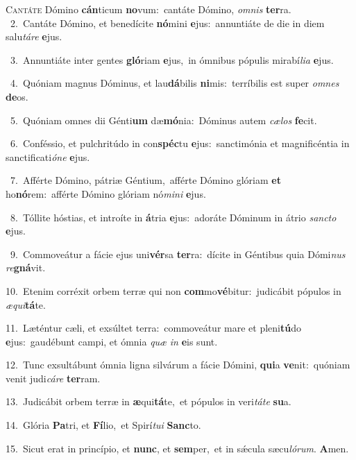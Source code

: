 \lettrine{\initial\textcolor{\initialcolor}{C}}{antáte} Dómino \textbf{cán}\-ticum \textbf{no}\-vum:~\star cantáte Dómino, \textit{om}\-\textit{nis} \textbf{ter}\-ra.\\
{\numbfont\textcolor{\numbcolor}{~2.}}~Cantáte Dómino, et benedícite \textbf{nó}\-mini \textbf{e}\-jus:~\star annuntiáte de die in diem salu\-\textit{tá}\-\textit{re} \textbf{e}\-jus.\par
{\numbfont\textcolor{\numbcolor}{~3.}}~Annuntiáte inter gentes \textbf{gló}\-riam \textbf{e}\-jus,~\star in ómnibus pópulis mirabí\-\textit{li}\-\textit{a} \textbf{e}\-jus.\par
{\numbfont\textcolor{\numbcolor}{~4.}}~Quóniam magnus Dóminus, et lau\-\textbf{dá}\-bilis \textbf{ni}\-mis:~\star terríbilis est super \textit{om}\-\textit{nes} \textbf{de}\-os.\par
{\numbfont\textcolor{\numbcolor}{~5.}}~Quóniam omnes dii Génti\textbf{um} dæ\-\textbf{mó}\-nia:~\star Dóminus autem \textit{cæ}\-\textit{los} \textbf{fe}\-cit.\par
{\numbfont\textcolor{\numbcolor}{~6.}}~Conféssio, et pulchritúdo in con\-\textbf{spéc}\-tu \textbf{e}\-jus:~\star sanctimónia et magnificéntia in sanctificati\-\textit{ó}\-\textit{ne} \textbf{e}\-jus.\par
{\numbfont\textcolor{\numbcolor}{~7.}}~Afférte Dómino, pátriæ Géntium,~\dagger afférte Dómino glóriam \textbf{et} ho\-\textbf{nó}\-rem:~\star afférte Dómino glóriam nó\-\textit{mi}\-\textit{ni} \textbf{e}\-jus.\par
{\numbfont\textcolor{\numbcolor}{~8.}}~Tóllite hóstias, et introíte in \textbf{á}\-tria \textbf{e}\-jus:~\star adoráte Dóminum in átrio \textit{sanc}\-\textit{to} \textbf{e}\-jus.\par
{\numbfont\textcolor{\numbcolor}{~9.}}~Commoveátur a fácie ejus uni\-\textbf{vér}\-sa \textbf{ter}\-ra:~\star dícite in Géntibus quia Dómi\textit{nus} \textit{re}\-\textbf{gná}vit.\par
{\numbfont\textcolor{\numbcolor}{10.}}~Etenim corréxit orbem terræ qui non \textbf{com}\-mo\-\textbf{vé}\-bitur:~\star judicábit pópulos in \textit{æ}\-\textit{qui}\textbf{tá}te.\par
{\numbfont\textcolor{\numbcolor}{11.}}~Læténtur cæli, et exsúltet terra:~\dagger commoveátur mare et pleni\-\textbf{tú}\-do \textbf{e}\-jus:~\star gaudébunt campi, et ómnia \textit{quæ} \textit{in} \textbf{e}\-is sunt.\par
{\numbfont\textcolor{\numbcolor}{12.}}~Tunc exsultábunt ómnia ligna silvárum a fácie Dómini, \textbf{qui}\-a \textbf{ve}\-nit:~\star quóniam venit judi\-\textit{cá}\-\textit{re} \textbf{ter}\-ram.\par
{\numbfont\textcolor{\numbcolor}{13.}}~Judicábit orbem terræ in \textbf{æ}\-qui\-\textbf{tá}\-te,~\star et pópulos in veri\-\textit{tá}\-\textit{te} \textbf{su}\-a.\par
{\numbfont\textcolor{\numbcolor}{14.}}~Glória \textbf{Pa}\-tri, et \textbf{Fí}\-lio,~\star et Spirí\-\textit{tu}\-\textit{i} \textbf{Sanc}\-to.\par
{\numbfont\textcolor{\numbcolor}{15.}}~Sicut erat in princípio, et \textbf{nunc}\-, et \textbf{sem}\-per,~\star et in sǽcula sæcu\-\textit{ló}\-\textit{rum}. \textbf{A}\-men.\par
